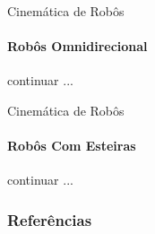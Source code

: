 \documentclass[aspectratio=169]{beamer}
\begin{document}
\begin{frame}{Cinemática de Robôs}
    \framesubtitle{Robôs Omnidirecional}
    continuar ...
\end{frame}

\begin{frame}{Cinemática de Robôs}
    \framesubtitle{Robôs Com Esteiras}
    continuar ...
\end{frame}

  
\begin{frame}[t, allowframebreaks]
	\frametitle{Referências}
	
\end{frame}
  
\end{document}
